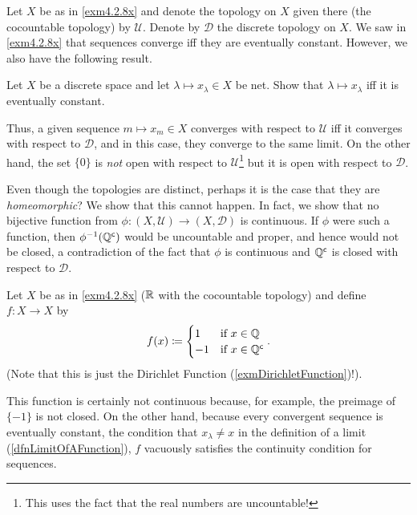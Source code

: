 \begin{exm}\label{exm4.2.25}
Let $X$ be as in \cref{exm4.2.8x} and denote the topology on $X$ given there (the cocountable topology) by $\mathcal{U}$.  Denote by $\mathcal{D}$ the discrete topology on $X$.  We saw in \cref{exm4.2.8x} that sequences converge iff they are eventually constant.  However, we also have the following result.
\begin{exr}
Let $X$ be a discrete space and let $\lambda \mapsto x_\lambda \in X$ be net.  Show that $\lambda \mapsto x_\lambda$ iff it is eventually constant.
\end{exr}
Thus, a given sequence $m\mapsto x_m\in X$ converges with respect to $\mathcal{U}$ iff it converges with respect to $\mathcal{D}$, and in this case, they converge to the same limit.  On the other hand, the set $\{ 0\}$ is \emph{not} open with respect to $\mathcal{U}$\footnote{This uses the fact that the real numbers are uncountable!} but it is open with respect to $\mathcal{D}$.

Even though the topologies are distinct, perhaps it is the case that they are \emph{homeomorphic}?  We show that this cannot happen.  In fact, we show that no bijective function from $\phi :(X,\mathcal{U})\rightarrow (X,\mathcal{D})$ is continuous.  If $\phi$ were such a function, then $\phi ^{-1}(\mathbb{Q} ^{\mathsf{c}})$ would be uncountable and proper, and hence would not be closed, a contradiction of the fact that $\phi$ is continuous and $\mathbb{Q} ^{\mathsf{c}}$ is closed with respect to $\mathcal{D}$.
\end{exm}
\begin{exm}\label{exm4.2.8}
Let $X$ be as in \cref{exm4.2.8x} ($\mathbb{R}$ with the cocountable topology) and define $f:X\rightarrow X$ by
\begin{equation}
f(x)\coloneqq \begin{cases}1 & \text{if }x\in \mathbb{Q} \\ -1 & \text{if }x\in \mathbb{Q} ^{\mathsf{c}}\end{cases}.
\end{equation}
(Note that this is just the Dirichlet Function (\cref{exmDirichletFunction})!).

This function is certainly not continuous because, for example, the preimage of $\{ -1\}$ is not closed.  On the other hand, because every convergent sequence is eventually constant, the condition that $x_\lambda \neq x$ in the definition of a limit (\cref{dfnLimitOfAFunction}), $f$ vacuously satisfies the continuity condition for sequences.
\end{exm}
